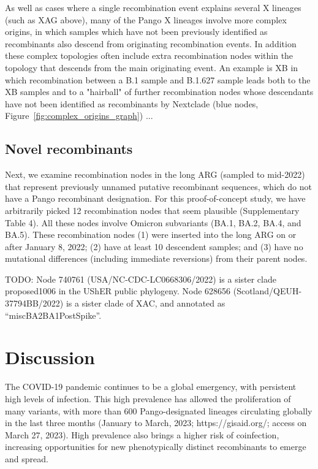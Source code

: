 \documentclass{article}
\begin{document}
As well as cases where a single recombination event explains several X lineages (such as XAG above), many of the Pango X lineages involve more complex origins, in which samples which have not been previously identified as recombinants also descend from originating recombination events. In addition these complex topologies often include extra recombination nodes within the topology that descends from the main originating event. An example is XB in which recombination between a B.1 sample and B.1.627 sample leads both to the XB samples and to a "hairball" of further recombination nodes whose descendants have not been identified as recombinants by Nextclade (blue nodes, Figure~\ref{fig:complex_origins_graph})  ...

\subsection{Novel recombinants}
Next, we examine recombination nodes in the long ARG (sampled to mid-2022) that represent previously unnamed putative recombinant sequences, which do not have a Pango recombinant designation. For this proof-of-concept study, we have arbitrarily picked 12 recombination nodes that seem plausible (Supplementary Table 4). All these nodes involve Omicron subvariants (BA.1, BA.2, BA.4, and BA.5). These recombination nodes (1) were inserted into the long ARG on or after January 8, 2022; (2) have at least 10 descendent samples; and (3) have no mutational differences (including immediate reversions) from their parent nodes.

TODO: Node  740761 (USA/NC-CDC-LC0668306/2022) is a sister clade proposed1006 in the UShER public phylogeny. Node 628656 (Scotland/QEUH-37794BB/2022) is a sister clade of XAC, and annotated as ``miscBA2BA1PostSpike''.

\section{Discussion}
The COVID-19 pandemic continues to be a global emergency, with persistent high levels of infection. This high prevalence has allowed the proliferation of many variants, with more than 600 Pango-designated lineages circulating globally in the last three months (January to March, 2023; https://gisaid.org/; access on March 27, 2023). High prevalence also brings a higher risk of coinfection, increasing opportunities for new phenotypically distinct recombinants to emerge and spread.
\end{document}
